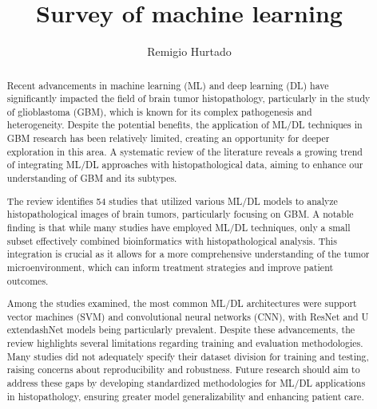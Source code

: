 \documentclass[runningheads]{llncs}
\begin{document}
%
\title{Survey of machine learning}
%
%
\author{Remigio Hurtado}
%
%
%
\maketitle    
%
\begin{abstract}
Recent advancements in machine learning (ML) and deep learning (DL) have significantly impacted the field of brain tumor histopathology, particularly in the study of glioblastoma (GBM), which is known for its complex pathogenesis and heterogeneity. Despite the potential benefits, the application of ML/DL techniques in GBM research has been relatively limited, creating an opportunity for deeper exploration in this area. A systematic review of the literature reveals a growing trend of integrating ML/DL approaches with histopathological data, aiming to enhance our understanding of GBM and its subtypes.

The review identifies 54 studies that utilized various ML/DL models to analyze histopathological images of brain tumors, particularly focusing on GBM. A notable finding is that while many studies have employed ML/DL techniques, only a small subset effectively combined bioinformatics with histopathological analysis. This integration is crucial as it allows for a more comprehensive understanding of the tumor microenvironment, which can inform treatment strategies and improve patient outcomes.

Among the studies examined, the most common ML/DL architectures were support vector machines (SVM) and convolutional neural networks (CNN), with ResNet and U	extendash{}Net models being particularly prevalent. Despite these advancements, the review highlights several limitations regarding training and evaluation methodologies. Many studies did not adequately specify their dataset division for training and testing, raising concerns about reproducibility and robustness. Future research should aim to address these gaps by developing standardized methodologies for ML/DL applications in histopathology, ensuring greater model generalizability and enhancing patient care.
\end{abstract}
\end{document}
